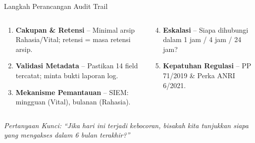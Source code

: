 \documentclass[aspectratio=169,11pt]{beamer}
\begin{document}
\begin{frame}{Langkah Perancangan Audit Trail}
    \vspace{0.2cm}
    \begin{columns}[T]
        \begin{premiumbox}
            \scriptsize
            \begin{enumerate}
                \item \textbf{Cakupan \& Retensi} -- Minimal arsip Rahasia/Vital; retensi = masa retensi arsip.
                \item \textbf{Validasi Metadata} -- Pastikan 14 field tercatat; minta bukti laporan log.
                \item \textbf{Mekanisme Pemantauan} -- SIEM: mingguan (Vital), bulanan (Rahasia).
            \end{enumerate}
        \end{premiumbox}
        
        \begin{orangebox}
            \scriptsize
            \begin{enumerate}\setcounter{enumi}{3}
                \item \textbf{Eskalasi} -- Siapa dihubungi dalam 1 jam / 4 jam / 24 jam?
                \item \textbf{Kepatuhan Regulasi} -- PP 71/2019 \& Perka ANRI 6/2021.
            \end{enumerate}
        \end{orangebox}
    \end{columns}
    
    \vspace{0.2cm}
    \begin{center}
        \textcolor{plnblue}{\scriptsize\textit{Pertanyaan Kunci: ``Jika hari ini terjadi kebocoran, bisakah kita tunjukkan siapa yang mengakses dalam 6 bulan terakhir?''}}
    \end{center}
\end{frame}
\end{document}
